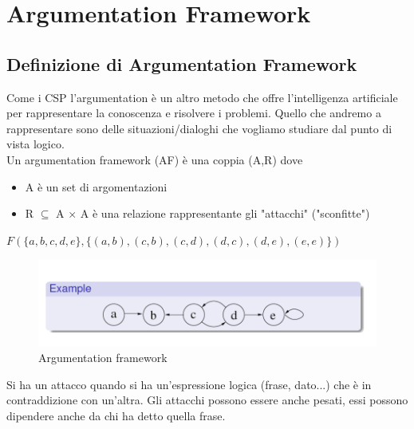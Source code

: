 \chapter{Argumentation Framework} \label{ch:Argumentation Framework}
\section{Definizione di Argumentation Framework}
Come i CSP l'argumentation è un altro metodo che offre l'intelligenza
artificiale per rappresentare la conoscenza e risolvere i problemi. Quello che
andremo a rappresentare sono delle situazioni/dialoghi che vogliamo studiare dal
punto di vista logico.\\
Un argumentation framework (AF) è una coppia (A,R) dove
\begin{itemize}
    \item A è un set di argomentazioni
    \item R $\subseteq$ A $\times$ A è una relazione rappresentante gli "attacchi"
          ("sconfitte")
\end{itemize}
\begin{center}
    $F(\{a,b,c,d,e\}, \{(a,b),(c,b),(c,d),(d,c),(d,e),(e,e)\})$
\end{center}
\begin{figure}[H]
    \centering
    \includegraphics[width=12cm, keepaspectratio]{img/Cap6/arg1.png}
    \caption{Argumentation framework}
\end{figure}

Si ha un attacco quando si ha un'espressione logica (frase, dato...) che è in
contraddizione con un'altra. Gli attacchi possono essere anche pesati, essi
possono dipendere anche da chi ha detto quella frase.

